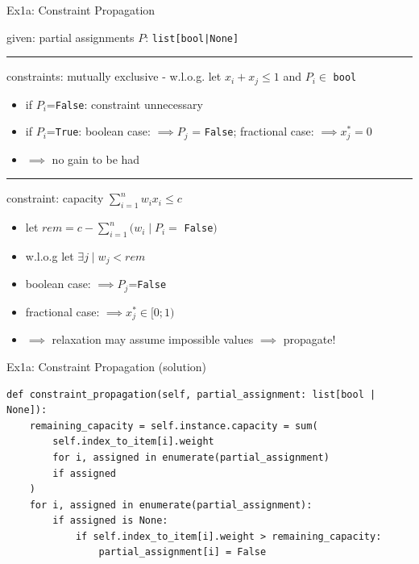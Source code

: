 \documentclass[fleqn,11pt,aspectratio=169]{beamer}
\begin{document}
\begin{frame}{Ex1a: Constraint Propagation}
	
\begin{center}
	\large given: partial assignments $P$: \texttt{list[bool|None]}
\end{center}

\hrule

\vspace{5pt}
constraints: mutually exclusive - w.l.o.g. let $x_i + x_j \leq 1$ and $P_i \in$ \texttt{bool}
\begin{itemize}
	\item if $P_i$=\texttt{False}: constraint unnecessary
	\item if $P_i$=\texttt{True}: boolean case: $\implies P_j$ = \texttt{False}; fractional case: $\implies x_j^* = 0$
	\item $\implies$ no gain to be had
\end{itemize}

\hrule

\vspace{5pt}
constraint: capacity $\sum_{i=1}^{n} w_ix_i \leq c$  
\begin{itemize}
	\item let $rem = c - \sum_{i=1}^{n}(w_i \mid P_i =$ \texttt{False}$)$
	\item w.l.o.g let $\exists j \mid w_j < rem$
	\item boolean case: $\implies P_j$=\texttt{False}
	\item fractional case: $\implies x_j^* \in [0;1)$
	\item $\implies$ relaxation may assume impossible values $\implies$ propagate! 
\end{itemize}
\end{frame}

\begin{frame}[fragile]{Ex1a: Constraint Propagation (solution)}
\begin{verbatim}
def constraint_propagation(self, partial_assignment: list[bool | None]):
	remaining_capacity = self.instance.capacity = sum(
		self.index_to_item[i].weight
		for i, assigned in enumerate(partial_assignment)
		if assigned
	)
	for i, assigned in enumerate(partial_assignment):
		if assigned is None:
			if self.index_to_item[i].weight > remaining_capacity:
				partial_assignment[i] = False
\end{verbatim}
\end{frame}
\end{document}
